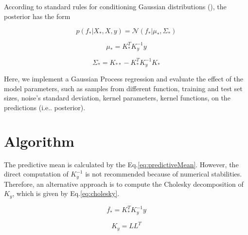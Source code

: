 \documentclass{article}
\makeatletter
\DeclareRobustCommand\onedot{\futurelet\@let@token\@onedot}
\def\@onedot{\ifx\@let@token.\else.\null\fi\xspace}
\def\ie{i.e\onedot} \def\Ie{I.e\onedot}
\makeatother
\begin{document}
According to standard rules for conditioning Gaussian distributions (\cite{murphy2012}), the posterior has the form

\begin{equation}
p(f_*|X_*, X, y) = \mathcal{N}(f_*|\mu_*, \Sigma_*)
\end{equation}

\begin{equation}
  \mu_* = K_*^T K_y^{-1} y
\end{equation}

\begin{equation}
  \Sigma_* = K_{**} - K_*^T K_y^{-1} K_*
\end{equation}

Here, we implement a Gaussian Process regression and evaluate the effect of the model parameters, such as samples from different function, training and test set sizes, noise's standard deviation, kernel parameters, kernel functions, on the predictions (\ie posterior).



\section{Algorithm}

The predictive mean is calculated by the Eq.\eqref{eq:predictiveMean}. However, the direct computation of $K^{-1}_y$ is not recommended because of numerical stabilities. Therefore, an alternative approach is to compute the Cholesky decomposition of $K_y$, which is given by Eq.\eqref{eq:cholesky}. 

\begin{equation}
  \overline{f_*} = K^T_*K^{-1}_yy
  \label{eq:predictiveMean}
\end{equation}

\begin{equation}
  K_y = LL^T
  \label{eq:cholesky}
\end{equation}
\end{document}

